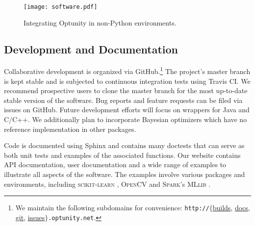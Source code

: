 \documentclass[twoside,11pt]{article}
\newcommand{\optunity}{{\sc Optunity}\xspace}
\begin{document}
\begin{figure}[!h]
  \centering 
      \texttt{[image: software.pdf]} 
  \caption{Integrating \optunity in non-Python environments.}\label{fig:workflow}
\vspace{-1.5em}
\end{figure}

\subsection{Development and Documentation}
Collaborative development is organized via GitHub.\footnote{We maintain the following subdomains for convenience: \texttt{http://}$\{$\href{http://builds.optunity.net}{builds}, \href{http://docs.optunity.net}{docs}, \href{http://git.optunity.net}{git}, \href{http://issues.optunity.net}{issues}$\}$\texttt{.optunity.net}.} The project's master branch is kept stable and is subjected to continuous integration tests using Travis CI. 
We recommend prospective users to clone the master branch for the most up-to-date stable version of the software. Bug reports and feature requests can be filed via issues on GitHub. Future development efforts will focus on wrappers for Java and C/C++. We additionally plan to incorporate Bayesian optimizers which have no reference implementation in other packages. %

Code is documented using Sphinx and contains many doctests that can serve as both unit tests and examples of the associated functions. 
Our website contains API documentation, user documentation and a wide range of examples to illustrate all aspects of the software. 
The examples involve various packages and environments, including \textsc{scikit-learn} \citep{pedregosa2011scikit}, \textsc{OpenCV} and \textsc{Spark}'s \textsc{MLlib} \citep{zaharia2010spark}.

\end{document}
